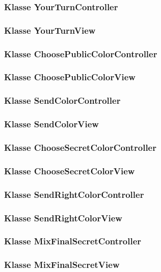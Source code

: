 \documentclass{article}
\begin{document}
	\subsubsection{Klasse YourTurnController}

	\subsubsection{Klasse YourTurnView}

	\subsubsection{Klasse ChoosePublicColorController}

	\subsubsection{Klasse ChoosePublicColorView}

	\subsubsection{Klasse SendColorController}

	\subsubsection{Klasse SendColorView}

	\subsubsection{Klasse ChooseSecretColorController}

	\subsubsection{Klasse ChooseSecretColorView}

	\subsubsection{Klasse SendRightColorController}

	\subsubsection{Klasse SendRightColorView}

	\subsubsection{Klasse MixFinalSecretController}

	\subsubsection{Klasse MixFinalSecretView}
	
 \restoregeometry

\glsaddall
\printglossary[numberedsection, style=altlist]
\end{document}
